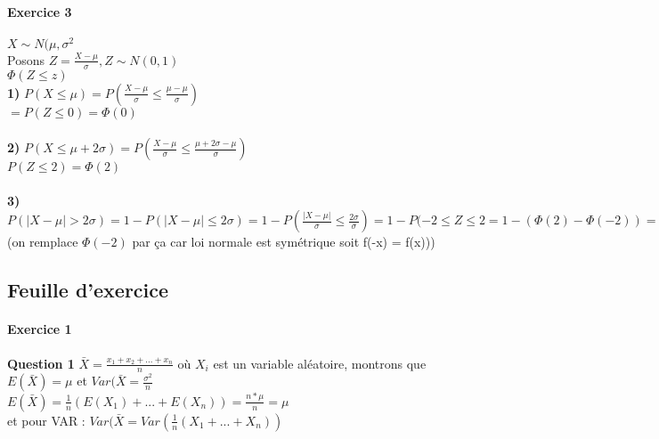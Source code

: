 \documentclass{article}
\begin{document}
\paragraph{Exercice 3 }
$X \sim N(\mu,\sigma^2$\\
Posons $ Z= \frac{X-\mu}{\sigma}, Z\sim N(0,1)$\\$\Phi(Z \leq z)$\\
\textbf{1)} $P(X \leq \mu) = P(\frac{X-\mu}{\sigma} \leq \frac{\mu -\mu}{\sigma})$\\
$= P(Z\leq 0) = \Phi(0)$\\\\
\textbf{2)} $P(X \leq \mu + 2 \sigma)  = P(\frac{X-\mu}{\sigma} \leq \frac{\mu +2\sigma -\mu}{\sigma})$ \\
$P(Z \leq 2) = \Phi(2)$\\\\
\textbf{3)} $P(|X-\mu| > 2\sigma) = 1-P(|X - \mu| \leq 2\sigma) = 1-P(\frac{|X - \mu|}{\sigma} \leq \frac{2\sigma}{\sigma}) = 1-P(-2 \leq Z \leq 2 = 1-(\Phi(2)-\Phi(-2)) = 1-(\Phi(2) - (1-\Phi(2))$(on remplace $\Phi(-2)$ par ça car loi normale est symétrique soit f(-x) = f(x)))

\subsection{Feuille d'exercice}
\paragraph{Exercice 1} \textbf{Question 1 } $\bar{X} = \frac{x_1+x_2+...+x_n}{n}$ où $X_i$ est un variable aléatoire, montrons que $E(\bar{X}) = \mu$ et $Var(\bar{X} = \frac{\sigma^2}{n}$\\$E(\bar{X}) = \frac{1}{n}(E(X_1)+...+E(X_n))= \frac{n*\mu}{n} = \mu$\\et pour VAR : $Var(\bar{X} = Var(\frac{1}{n}(X_1+...+X_n))$
\end{document}
